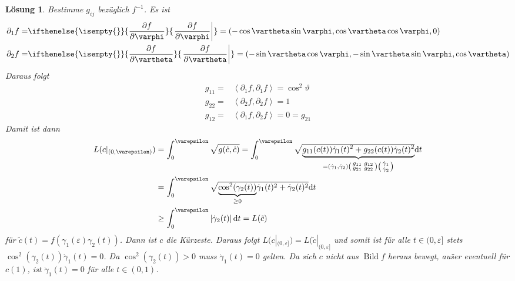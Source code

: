 \documentclass[paper=A4, twoside, chapterprefix=true, bibliography=totoc, headsepline]{scrbook}
\let\temp\phi{}
\let\phi\varphi{}
\let\varphi\temp{}
\let\temp\theta{}
\let\theta\vartheta{}
\let\vartheta\temp{}
\let\temp\epsilon{}
\let\epsilon\varepsilon{}
\let\varepsilon\temp{}
\let\temp\rho{}
\let\rho\varrho{}
\let\varrho\temp{}
\DeclareMathOperator{\Bild}{Bild}
\newcommand{\dop}{\mathrm{d}}
\newcommand{\pdifffrac}[3][]{\ifthenelse{\isempty{#1}}{\frac{\partial #2}{\partial #3}}{\left. \frac{\partial #2}{\partial #3} \right|_{#1}}}
\theoremstyle{plain}
\theoremstyle{nonumberplain}
\theoremstyle{empty}
\theoremstyle{break}
\newtheorem{Loes}{L\"osung}
\begin{document}
\begin{Loes}
Bestimme $g_{ij}$ bez\"uglich $f^{-1}$. Es ist
\begin{align*}
	\partial_1 f = & \pdifffrac{f}{\phi} = \left( -\cos\theta \sin\phi, \cos\theta \cos\phi, 0 \right)\\
	\partial_2 f = & \pdifffrac{f}{\theta} = \left( -\sin\theta \cos\phi, -\sin\theta \sin\phi, \cos\theta \right)\\
\end{align*}
Daraus folgt
\begin{align*}
	g_{11} = & \left\langle \partial_1 f, \partial_1 f \right\rangle = \cos^2 \theta\\
	g_{22} = & \left\langle \partial_2 f, \partial_2 f \right\rangle = 1\\
	g_{12} = & \left\langle \partial_1 f, \partial_2 f \right\rangle = 0 = g_{21}
\end{align*}
Damit ist dann
\begin{align*}
	L(c|_{(0, \epsilon)}) &= \int_0^\epsilon \sqrt{g(\dot c, \dot c)} = \int_0^\epsilon \sqrt{\vphantom{g(\dot c, \dot c)} \smash{\underbrace{g_{11}(c(t)) \dot\gamma_1(t)^2 + g_{22}(c(t)) \dot\gamma_2(t)^2}_{= (\dot\gamma_1, \dot\gamma_2) \left(\begin{smallmatrix} g_{11} & g_{12} \\ g_{21} & g_{22} \end{smallmatrix}\right) \left(\begin{smallmatrix} \dot\gamma_1 \\ \dot\gamma_2 \end{smallmatrix}\right)}}} \dop t\\
	&= \int_0^\epsilon \sqrt{ \smash{\underbrace{\cos^2(\gamma_2(t))}_{\ge 0}} \dot\gamma_1(t)^2 + \dot\gamma_2(t)^2} \dop t \rule{0pt}{33pt}\\ %
	&\ge \int_0^\epsilon \left| \dot\gamma_2(t) \right| \dop t =L(\tilde c) \rule{0pt}{25pt}%
\end{align*}
f\"ur $\tilde c(t) = f(\gamma_1(\epsilon) \gamma_2(t))$. Dann ist $c$ die K\"urzeste. Daraus folgt $L(c|_{(0,\epsilon]}) = L(\tilde c|_{(0,\epsilon]}$ und somit ist f\"ur alle $t \in (0,\epsilon]$ stets $\cos^2(\gamma_2(t)) \dot\gamma_1(t) = 0$. Da $\cos^2(\gamma_2(t)) > 0$ muss $\dot\gamma_1(t) = 0$ gelten. Da sich $c$ nicht aus $\Bild f$ heraus bewegt, au\"ser eventuell f\"ur $c(1)$, ist $\dot\gamma_1(t) = 0$ f\"ur alle $t \in (0,1)$.
\end{Loes}
\end{document}
